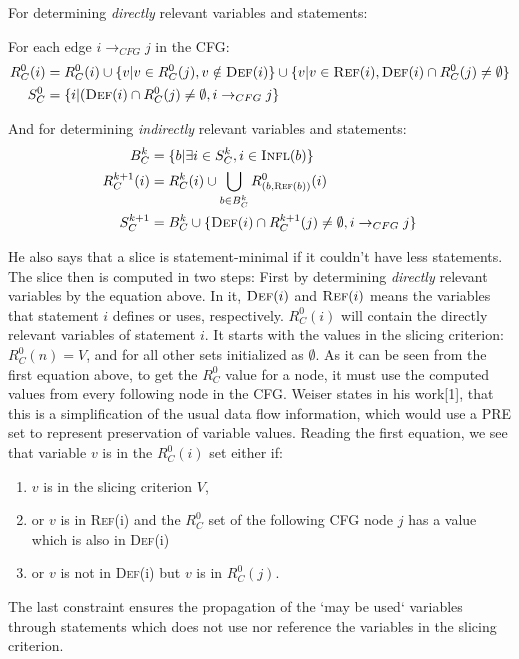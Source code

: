 \documentclass[oneside,12pt,a4paper]{book}
\begin{document}
For determining \textit{directly} relevant variables and statements:

For each edge $i \rightarrow_{CFG} j$ in the CFG:
\begin{align*}
R^0_C(i) &= R^0_C(i) \cup \{ v | v \in R^0_C(j), v \notin \textsc{Def}(i) \} \cup \{ v | v \in \textsc{Ref}(i), \textsc{Def}(i) \cap R^0_C(j) \neq \emptyset \} \\
S^0_C &= \{ i | (\textsc{Def}(i) \cap R^0_C(j) \neq \emptyset, i \rightarrow_{CFG} j \}
\end{align*}

And for determining \textit{indirectly} relevant variables and statements:
\begin{align*}
B^k_C &= \{ b | \exists i \in S^k_C, i \in \textsc{Infl}(b) \} \\
R^{k+1}_C(i) &= R^k_C(i) \cup \bigcup_{b \in B^k_C} R^0_{(b, \textsc{Ref}(b))} (i) \ \\
S^{k+1}_C &= B^k_C \cup \{ \textsc{Def}(i) \cap R^{k+1}_C(j) \neq \emptyset, i \rightarrow_{CFG} j \} 
\end{align*}

He also says that a slice is statement-minimal if it couldn't have less statements. The slice then is computed in two steps:
First by determining \textit{directly} relevant variables by the equation above. In it, $\textsc{Def}(i)$ and $\textsc{Ref}(i)$ means the variables that statement $i$ defines or uses, respectively. $R^0_C(i)$ will contain the directly relevant variables of statement $i$. It starts with the values in the slicing criterion: $R^0_C(n) = V$, and for all other sets initialized as $\emptyset$. As it can be seen from the first equation above, to get the $R^0_C$ value for a node, it must use the computed values from every following node in the CFG. Weiser states in his work[1], that this is a simplification of the usual data flow information, which would use a PRE set to represent preservation of variable values. Reading the first equation, we see that variable $v$ is in the $R^0_C(i)$ set either if:
\begin{enumerate}
\item $v$ is in the slicing criterion $V$,
\item or $v$ is in \textsc{Ref}(i) and the $R^0_C$ set of the following CFG node $j$ has a value which is also in \textsc{Def}(i) 
\item or $v$ is not in \textsc{Def}(i) but $v$ is in $R^0_C(j)$.
\end{enumerate}
The last constraint ensures the propagation of the `may be used` variables through statements which does not use nor reference the variables in the slicing criterion. 
\end{document}
